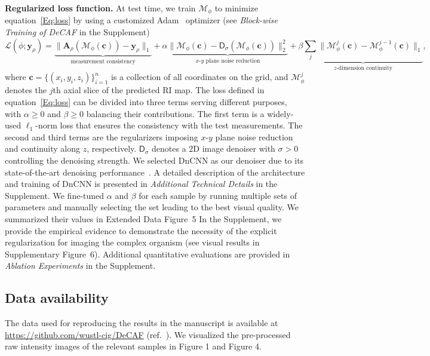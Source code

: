 \documentclass[11pt]{article}
\theoremstyle{plain} %
\def\proposed{DeCAF}
\def\cbm{{\bm{c}}}
\def\ybm{{\bm{y}}}
\def\Abm{{\bm{A}}}
\def\Dsf{{\mathsf{D}}}
\def\Mcal{{\mathcal{M}}}
\def\Lcal{{\mathcal{L}}}
\begin{document}
\vspace{0.5em}
\noindent
\textbf{Regularized loss function.}
At test time, we train $\Mcal_\phi$ to minimize equation~\eqref{Eq:loss} by using a customized Adam~\cite{Kingma.Ba2015} optimizer (see \emph{Block-wise Training of \proposed} in the Supplement)
\begin{equation}
\label{Eq:loss}
\Lcal(\phi;\ybm_\rho) = \underbrace{\|\Abm_\rho(\Mcal_\phi(\cbm)) - \ybm_\rho\|_1}_\text{measurement consistency} + \alpha\underbrace{\|\Mcal_\phi(\cbm)-\Dsf_\sigma(\Mcal_\phi(\cbm))\|_2^2}_\text{$x$-$y$ plane noise reduction} + \beta\underbrace{\sum_j \|\Mcal^{j}_\phi(\cbm) - \Mcal^{j-1}_\phi(\cbm)\|_1}_\text{$z$-dimension continuity},
\end{equation}
where $\cbm=\{(x_i,y_i,z_i)\}_{i=1}^n$ is a collection of all coordinates on the grid, and $\Mcal_\phi^j$ denotes the $j$th axial slice of the predicted RI map.
The loss defined in equation~\eqref{Eq:loss} can be divided into three terms serving different purposes, with $\alpha\geq0$ and $\beta\geq0$ balancing their contributions.
The first term is a widely-used $\ell_1$-norm loss that ensures the consistency with the test measurements. 
The second and third terms are the regularizers imposing $x$-$y$ plane noise reduction and continuity along $z$, respectively.
$\Dsf_\sigma$ denotes a $2$D image denoiser with $\sigma>0$ controlling the denoising strength.
We selected DnCNN as our denoiser due to its state-of-the-art denoising performance~\cite{Zhang.etal2017}. 
A detailed description of the architecture and training of DnCNN is presented in \emph{Additional Technical Details} in the Supplement.
We fine-tuned $\alpha$ and $\beta$ for each sample by running multiple sets of parameters and manually selecting the set leading to the best visual quality. 
We summarized their values in Extended Data Figure~5
In the Supplement, we provide the empirical evidence to demonstrate the necessity of the explicit regularization for imaging the complex organism (see visual results in Supplementary Figure~6). 
Additional quantitative evaluations are provided in \emph{Ablation Experiments} in the Supplement.

\subsection*{Data availability}
The data used for reproducing the results in the manuscript is available at \url{https://github.com/wustl-cig/DeCAF} (ref.~\cite{Code_Data}). 
We visualized the pre-processed raw intensity images of the relevant samples in Figure 1 and Figure 4.
\end{document}
